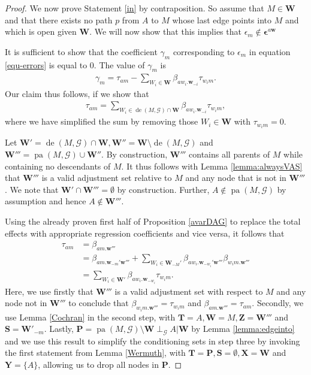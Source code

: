 \documentclass[11pt,a4paper]{article}
\theoremstyle{definition}
\theoremstyle{remark}
\DeclareMathOperator{\pa}{pa}
\DeclareMathOperator{\de}{de}
\newcommand{\g}[1][G]{\mathcal{#1}}
\begin{document}
\begin{proof}
	We now prove Statement \eqref{in} by contraposition. So assume that $M \in \mathbf{W}$ and that there exists no path $p$ from $A$ to $M$ whose last edge points into $M$ and which is open given $\mathbf{W}$. We will now show that this implies that $\epsilon_m \notin \boldsymbol{\epsilon}^{a\mathbf{w}}$
	
	 It is sufficient to show that the coefficient $\gamma_m$ corresponding to $\epsilon_m$ in equation \eqref{equ-errors} is equal to 0. The value of $\gamma_m$ is
	\begin{align}
	\gamma_m = \tau_{am} - \sum_{W_i \in \mathbf{W}} \beta_{aw_i.\mathbf{w}_{-i}} \tau_{w_im}. 
	\label{eq:gamma}
	\end{align}
	Our claim thus follows, if we show that  
	\begin{align*}
	\tau_{am} = \sum_{W_i \in \de(M,\g) \cap \mathbf{W}} \beta_{aw_i.\mathbf{w}_{-i}} \tau_{w_im}, 
	\end{align*}
	where we have simplified the sum by removing those $W_i \in \mathbf{W}$ with $\tau_{w_im}=0$.
	
	Let $\mathbf{W}'=\de(M,\g) \cap \mathbf{W},\mathbf{W}''=\mathbf{W} \setminus \de(M,\g)$ and $\mathbf{W}'''=\pa(M,\g) \cup \mathbf{W}''$. 
	By construction, $\mathbf{W}'''$ contains all parents of $M$ while containing no  descendants of $M$. It thus follows with Lemma \ref{lemma:alwaysVAS} that $\mathbf{W}'''$ is a valid adjustment set relative to $M$ and any node that is not in $\mathbf{W}'''$. We note that $\mathbf{W}' \cap \mathbf{W}'''=\emptyset$ by construction. Further, $A \notin \pa(M,\g)$ by assumption and hence $A \notin \mathbf{W}'''$. 
	
	Using the already proven first half of Proposition \ref{avarDAG} to replace the total effects with appropriate regression coefficients and vice versa, it follows that
	\begin{align}
	\tau_{am} &= \beta_{am.\mathbf{w}'''}  \nonumber \\
	&= \beta_{am.\mathbf{w}_{-m}'\mathbf{w}'''} + \sum_{W_i \in \mathbf{W}_{-M}'} \beta_{aw_i.\mathbf{w}_{-w_i}'\mathbf{w}'''} \beta_{w_im.\mathbf{w}'''} \nonumber \\
	&= \sum_{W_i \in \mathbf{W'}} \beta_{aw_i.\mathbf{w}_{-w_i}} \tau_{w_im}.  \nonumber 
	\end{align}
	Here, we use firstly that $\mathbf{W}'''$ is a valid adjustment set with respect to $M$ and any node not in $\mathbf{W}'''$ to conclude that $\beta_{w_im.\mathbf{w'''}}=\tau_{w_im}$ and $\beta_{am.\mathbf{w'''}}=\tau_{am}$.
	Secondly, we use Lemma \ref{Cochran} in the second step, with $\mathbf{T}=A,\mathbf{W}=M,\mathbf{Z}=\mathbf{W}'''$ and $\mathbf{S}=\mathbf{W}'_{-m}$. Lastly, $\mathbf{P} = \pa(M,\g) \setminus \mathbf{W} \perp_{\g} A | \mathbf{W}$ by Lemma \ref{lemma:edgeinto} and we use this result to simplify the conditioning sets in step three by invoking the first statement from Lemma \ref{Wermuth}, with $\mathbf{T}=\mathbf{P}, \mathbf{S}=\emptyset, \mathbf{X}=\mathbf{W}$ and $\mathbf{Y}=\{A\}$, allowing us to drop all nodes in $\mathbf{P}$.
	

\end{proof}
\end{document}
